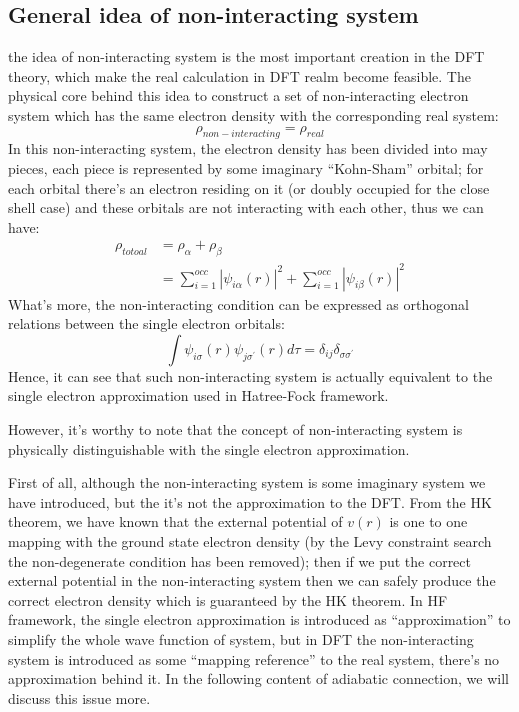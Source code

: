\subsection{General idea of non-interacting system}
\label{DFTI:2}
%
%
%
the idea of non-interacting system is the most important creation in
the DFT theory\cite{HK2}, which make the real calculation in DFT
realm become feasible. The physical core behind this idea to
construct a set of non-interacting electron system which has the
same electron density with the corresponding real system:
\begin{equation}\label{}
  \rho_{non-interacting} = \rho_{real}
\end{equation}
In this non-interacting system, the electron density has been
divided into may pieces, each piece is represented by some imaginary
``Kohn-Sham'' orbital; for each orbital there's an electron residing
on it (or doubly occupied for the close shell case) and these
orbitals are not interacting with each other, thus we can have:
\begin{align}\label{DFTIeq:27}
  \rho_{totoal} &= \rho_{\alpha} + \rho_{\beta} \nonumber \\
  &=\sum_{i=1}^{occ}|\psi_{i\alpha}(r)|^{2} +
  \sum_{i=1}^{occ}|\psi_{i\beta}(r)|^{2}
\end{align}
What's more, the non-interacting condition can be expressed as
orthogonal relations between the single electron orbitals:
\begin{equation}\label{DFTIeq:28}
\int \psi_{i\sigma}(r)\psi_{j\sigma^{'}}(r)d\tau =
\delta_{ij}\delta_{\sigma\sigma^{'}}
\end{equation}
Hence, it can see that such non-interacting system is actually
equivalent to the single electron approximation used in Hatree-Fock
framework.

However, it's worthy to note that the concept of non-interacting
system is physically distinguishable with the single electron
approximation.

First of all, although the non-interacting system is some imaginary
system we have introduced, but the it's not the approximation to the
DFT. From the HK theorem, we have known that the external potential
of $v(r)$ is one to one mapping with the ground state electron
density (by the Levy constraint search the non-degenerate condition
has been removed); then if we put the correct external potential in
the non-interacting system then we can safely produce the correct
electron density which is guaranteed by the HK theorem. In HF
framework, the single electron approximation is introduced as
``approximation'' to simplify the whole wave function of system, but
in DFT the non-interacting system is introduced as some ``mapping
reference'' to the real system, there's no approximation behind it.
In the following content of adiabatic connection, we will discuss
this issue more.

